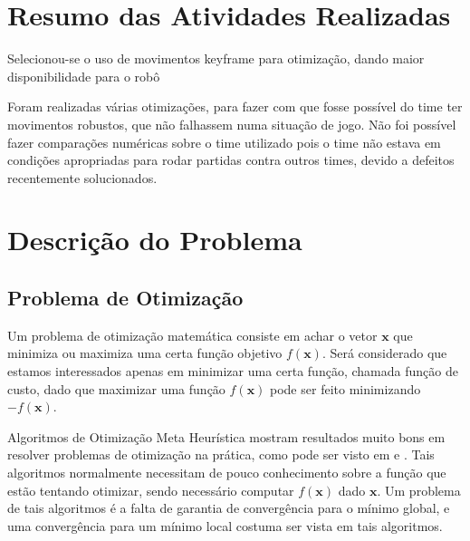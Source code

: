 \documentclass[
10pt, %
a4paper, %
oneside, %
headinclude,footinclude, %
BCOR5mm, %
]{scrartcl}
\begin{document}

\section{Resumo das Atividades Realizadas}

Selecionou-se o uso de movimentos keyframe para otimização, dando maior disponibilidade para o robô 

Foram realizadas várias otimizações, para fazer com que fosse possível do time ter movimentos robustos, que não falhassem numa situação de jogo. 
Não foi possível fazer comparações numéricas sobre o time utilizado pois o time não estava em condições apropriadas para rodar partidas contra outros times, devido a defeitos recentemente solucionados. 


\section{Descrição do Problema}

\subsection{Problema de Otimização}

Um problema de otimização matemática consiste em achar o vetor \( \mathrm{\mathbf{x}} \) que minimiza ou maximiza uma certa função objetivo \( f\left( \mathrm{\mathbf{x}} \right) \). Será considerado que estamos interessados apenas em minimizar uma certa função, chamada função de custo, dado que maximizar uma função \( f\left( \mathrm{\mathbf{x}} \right) \) pode ser feito minimizando  \( - f \left( \mathrm{\mathbf{x}} \right) \).





Algoritmos de Otimização Meta Heurística mostram resultados muito bons em resolver problemas de otimização na prática, como pode ser visto em \cite{LNAI14-Depinet} e \cite{rei2010optimizing}. Tais algoritmos normalmente necessitam de pouco conhecimento sobre a função que estão tentando otimizar, sendo necessário computar \( f\left( \mathrm{\mathbf{x}} \right) \) dado \( \mathrm{\mathbf{x}} \). Um problema de tais algoritmos é a falta de garantia de convergência para o mínimo global, e uma convergência para um mínimo local costuma ser vista em tais algoritmos.
\end{document}
